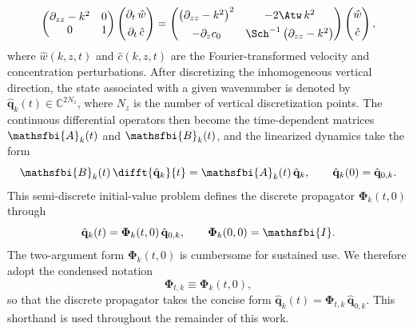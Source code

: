 \begin{equation}
    \label{eq:lti_dz_k_boussinesq}
    \begin{pmatrix}
        \partial_{zz}-k^{2} & 0 \\
        0 & 1
    \end{pmatrix}
    \begin{pmatrix}
        \partial_t\, \hat{w} \\[4pt]
        \partial_t\, \hat{c}
    \end{pmatrix}
    =
    \begin{pmatrix}
        \left(\partial_{zz}-k^{2}\right)^{2} & -2\Atw\,k^{2} \\[4pt]
        -\partial_{z}c_{0} & \Sch^{-1}\left(\partial_{zz}-k^{2}\right)
    \end{pmatrix}
    \begin{pmatrix}
        \hat{w} \\[4pt]
        \hat{c}
    \end{pmatrix},
\end{equation}
where \(\hat{w}(k,z,t)\) and \(\hat{c}(k,z,t)\) are the Fourier-transformed velocity and
concentration perturbations. After discretizing the inhomogeneous vertical direction, the state associated with a given wavenumber is denoted by \(\hat{\mathbf{q}}_{k}(t)\in\mathbb{C}^{2N_z}\), where \(N_z\) is the number of vertical discretization points. The continuous differential operators then become the time-dependent matrices \(\mathsfbi{A}_{k}(t)\) and \(\mathsfbi{B}_{k}(t)\), and the linearized dynamics take the form
\begin{equation}
    \label{eq:semidiscrete_system}
    \mathsfbi{B}_{k}(t)\,\difft{\hat{\mathbf{q}}_{k}}{t}
    =
    \mathsfbi{A}_{k}(t)\,\hat{\mathbf{q}}_{k},
    \qquad
    \hat{\mathbf{q}}_{k}(0)=\hat{\mathbf{q}}_{0,k}.
\end{equation}
This semi-discrete initial-value problem defines the discrete propagator
\(\boldsymbol{\Phi}_{k}(t,0)\) through
\begin{equation}
    \label{eq:discrete_propagator}
    \hat{\mathbf{q}}_{k}(t)
    =
    \boldsymbol{\Phi}_{k}(t,0)\,\hat{\mathbf{q}}_{0,k},
    \qquad
    \boldsymbol{\Phi}_{k}(0,0)=\mathsfbi{I}.
\end{equation}
The two-argument form \(\boldsymbol{\Phi}_{k}(t,0)\) is cumbersome for sustained use. We therefore adopt the condensed notation
\begin{equation}
    \label{eq:propagator_shorthand}
    \boldsymbol{\Phi}_{t,k} \equiv \boldsymbol{\Phi}_{k}(t,0),
\end{equation}
so that the discrete propagator takes the concise form \(\hat{\mathbf{q}}_{k}(t)=\boldsymbol{\Phi}_{t,k}\,\hat{\mathbf{q}}_{0,k}\). This shorthand is used throughout the remainder of this work.

